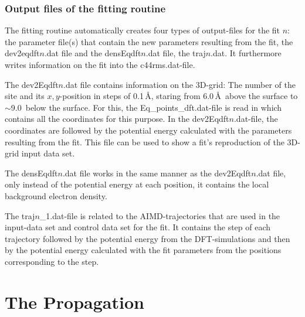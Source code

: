 \documentclass[twoside, 11pt, titlepage, captions=nooneline, a4paper, headsepline]{scrbook}%
\newcommand{\9}{\mathrm}
\newcommand{\0}{\,\mathrm}
\begin{document}
\subsubsection{Output files of the fitting routine}
The fitting routine automatically creates four types of output-files for the fit $n$: the parameter file(s) that contain the new parameters resulting from the fit, the dev2eqdft$n$.dat file and the densEqdft$n$.dat file, the traj$n$.dat. It furthermore writes information on the fit into the c44rms.dat-file.

The dev2Eqdft$n$.dat file contains information on the 3D-grid: The number of the site and its $x,y$-position in steps of 0.1\,\AA, staring from 6.0\,\AA~above the surface to $\sim$9.0\ below the surface. For this, the Eq\_points\_dft.dat-file is read in which contains all the coordinates for this purpose. In the dev2Eqdft$n$.dat-file, the coordinates are followed by the potential energy calculated with the parameters resulting from the fit. This file can be used to show a fit's reproduction of the 3D-grid input data set.

The densEqdft$n$.dat file works in the same manner as the dev2Eqdft$n$.dat file, only instead of the potential energy at each position, it contains the local background electron density.

The traj$n$\_1.dat-file is related to the AIMD-trajectories that are used in the input-data set and control data set for the fit. It contains the step of each trajectory followed by the potential energy from the DFT-simulations and then by the potential energy calculated with the fit parameters from the positions corresponding to the step.

\section{The Propagation}
\end{document}
